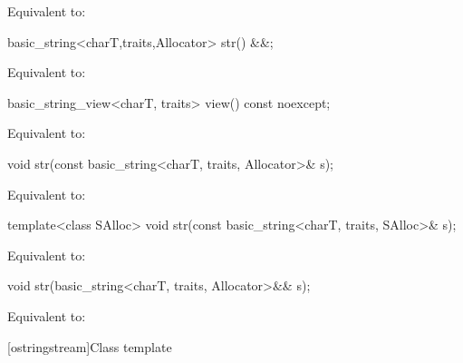 \begin{itemdescr}
\pnum
\effects
Equivalent to: 
\end{itemdescr}

%
\begin{itemdecl}
basic_string<charT,traits,Allocator> str() &&;
\end{itemdecl}

\begin{itemdescr}
\pnum
\effects
Equivalent to: 
\end{itemdescr}

%
\begin{itemdecl}
basic_string_view<charT, traits> view() const noexcept;
\end{itemdecl}

\begin{itemdescr}
\pnum
\effects
Equivalent to: 
\end{itemdescr}

%
\begin{itemdecl}
void str(const basic_string<charT, traits, Allocator>& s);
\end{itemdecl}

\begin{itemdescr}
\pnum
\effects
Equivalent to: 
\end{itemdescr}

%
\begin{itemdecl}
template<class SAlloc>
  void str(const basic_string<charT, traits, SAlloc>& s);
\end{itemdecl}

\begin{itemdescr}
\pnum
\effects
Equivalent to: 
\end{itemdescr}

%
\begin{itemdecl}
void str(basic_string<charT, traits, Allocator>&& s);
\end{itemdecl}
\begin{itemdescr}
\pnum
\effects
Equivalent to: 
\end{itemdescr}

[ostringstream]{Class template }

